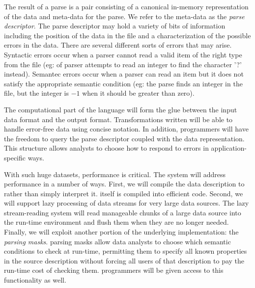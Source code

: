 \documentclass[11pt]{article}
\begin{document}
The result of a parse is a pair consisting of a canonical
in-memory representation of the data and meta-data for the parse.  We
refer to the meta-data as the {\em parse descriptor}. The parse
descriptor may hold a variety of bits of information including
the position of the data in the file and a characterization
of the possible errors in the data.  There are several
different sorts of errors that may arise.  Syntactic errors occur
when a parser cannot read a valid item of the right type from the file 
(eg: of parser attempts to read an integer to find the character '?'
instead).  Semantec errors occur when a parser can read an item
but it does not satisfy the appropriate semantic condition (eg: the
parse finds an integer in the file, but the integer is $-1$ when it
should be greater than zero).  

The computational part of the \datatype{} language will form the glue between
the input data format and the output format.  Transformations written
\datatype{} will be able to handle error-free data using concise 
notation.  In addition, programmers will have the freedom to
query the parse descriptor coupled with the data representation. 
This structure allows analysts
to choose how to respond to errors in application-specific ways.

With such huge datasets, performance is critical. The \datatype{} system
will address performance in a number of ways.  First, we will compile the
data description to \pads{} rather than simply interpret it. \pads{}
itself is compiled into efficient \C{} code.  Second, we will support 
lazy processing of data streams
for very large data sources.  The lazy stream-reading system will
read manageable chunks of a large data source into the run-time environment 
and flush them when they are no longer needed.  
Finally, we will exploit another portion of the underlying \pads{} implementation:
the \textit{parsing masks}.  \pads{} parsing masks allow data analysts to choose which semantic
conditions to check at run-time, permitting them to specify all known
properties in the source description without forcing all users of that
description to pay the run-time cost of checking them.  \datatype{} programmers
will be given access to this functionality as well.

\end{document}
